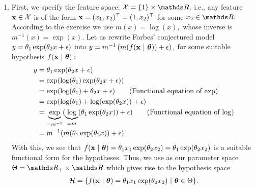\documentclass[a4paper]{article}
\begin{document}
{\begin{enumerate}
\item First, we specify the feature space: $\Xspace = \{1\} \times \R,$ i.e., any feature $\mathbf{x} \in \mathcal{X}$ is of the form $\mathbf{x}=(x_1,x_2)^\top = (1,x_2)^\top$ for some $x_2\in \R.$
%
According to the exercise we use $m(x)=\log(x),$ whose inverse is $m^{-1}(x)=\exp(x).$ 
%
Let us rewrite Forbes' conjectured model $  y = \theta_1 \exp(\theta_2 x + \epsilon)$ into $y = m^{-1} \left( m(f(\mathbf{x}~|~ \bm{\theta})) + \epsilon \right),$ for some suitable hypothesis $f(\mathbf{x}~|~ \bm{\theta}):$
%
\begin{align*}
%	
	y &=  \theta_1 \exp(\theta_2 x + \eps) \\
%	
	&=  \exp( \log(\theta_1)  \exp(\theta_2 x + \eps)) \\
%	
	&= \exp( \log(\theta_1) +  \theta_2 x + \eps) \tag{Functional equation of $\exp$} \\
%	
	&= \exp( \log(\theta_1) +  \log(\exp(\theta_2 x)) + \eps)  \\
%	
	&= \underbrace{\exp}_{=m^{-1}}( \underbrace{\log}_{=m}(\theta_1 \exp(\theta_2 x)) + \eps) \tag{Functional equation of $\log$} \\
	&= m^{-1}( m(\theta_1 \exp(\theta_2 x)) + \eps).
%	
\end{align*}
%
With this, we see that $f(\mathbf{x}~|~ \bm{\theta}) = \theta_1 x_1 \exp(\theta_2 x_2) = \theta_1 \exp(\theta_2 x_2)$ is a suitable functional form for the hypotheses.
%
Thus, we use as our parameter space $\Theta = \R_+ \times \R$ which gives rise to the hypothesis space
%
\begin{equation*}
	\begin{split}
		\mathcal{H} = \{f(\mathbf{x}~|~ \bm{\theta}) = \theta_1 x_1 \exp(\theta_2 x_2) ~|~   \bm{\theta} \in \Theta \}.
	\end{split}
\end{equation*}
%



\end{enumerate}}
\end{document}
